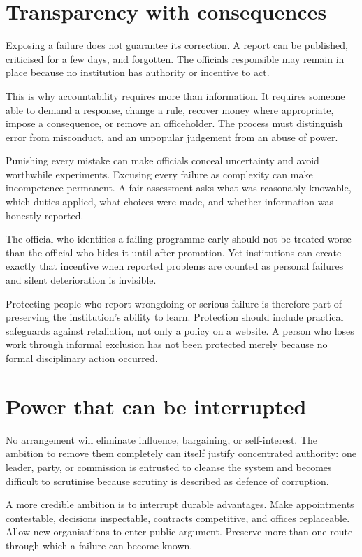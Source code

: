 \documentclass[12pt,a4paper]{book}
\begin{document}
\section*{Transparency with consequences}

Exposing a failure does not guarantee its correction. A report can be published, criticised for a few days, and forgotten. The officials responsible may remain in place because no institution has authority or incentive to act.

This is why accountability requires more than information. It requires someone able to demand a response, change a rule, recover money where appropriate, impose a consequence, or remove an officeholder. The process must distinguish error from misconduct, and an unpopular judgement from an abuse of power.

Punishing every mistake can make officials conceal uncertainty and avoid worthwhile experiments. Excusing every failure as complexity can make incompetence permanent. A fair assessment asks what was reasonably knowable, which duties applied, what choices were made, and whether information was honestly reported.

The official who identifies a failing programme early should not be treated worse than the official who hides it until after promotion. Yet institutions can create exactly that incentive when reported problems are counted as personal failures and silent deterioration is invisible.

Protecting people who report wrongdoing or serious failure is therefore part of preserving the institution's ability to learn. Protection should include practical safeguards against retaliation, not only a policy on a website. A person who loses work through informal exclusion has not been protected merely because no formal disciplinary action occurred.

\section*{Power that can be interrupted}

No arrangement will eliminate influence, bargaining, or self-interest. The ambition to remove them completely can itself justify concentrated authority: one leader, party, or commission is entrusted to cleanse the system and becomes difficult to scrutinise because scrutiny is described as defence of corruption.

A more credible ambition is to interrupt durable advantages. Make appointments contestable, decisions inspectable, contracts competitive, and offices replaceable. Allow new organisations to enter public argument. Preserve more than one route through which a failure can become known.
\end{document}
